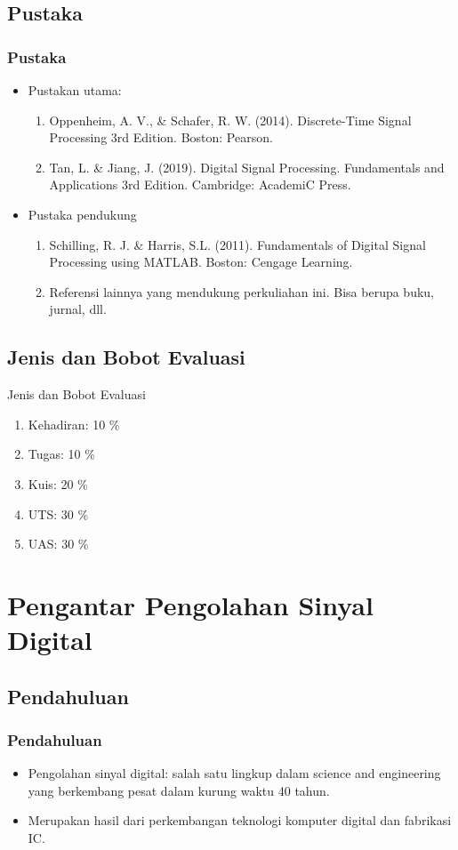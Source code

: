 \documentclass[pdflatex,compress]{beamer}
\begin{document}
\subsection{Pustaka}

\begin{frame}
	\frametitle{Pustaka}
	\begin{itemize}
		\item Pustakan utama:
		\begin{enumerate}
			\item Oppenheim, A. V., \& Schafer, R. W. (2014). Discrete-Time Signal Processing 3rd Edition. Boston: Pearson.
			\item Tan, L. \& Jiang, J. (2019). Digital Signal Processing. Fundamentals and Applications 3rd Edition. Cambridge: AcademiC Press.
		\end{enumerate}
		\item Pustaka pendukung
		\begin{enumerate}
			\item Schilling, R. J. \& Harris, S.L. (2011). Fundamentals of Digital Signal Processing using MATLAB. Boston:
			Cengage Learning.
			\item Referensi lainnya yang mendukung perkuliahan ini. Bisa berupa buku, jurnal, dll.
		\end{enumerate}
	\end{itemize}
\end{frame}

\subsection{Jenis dan Bobot Evaluasi}

\begin{frame}{Jenis dan Bobot Evaluasi}
	\begin{enumerate}
		\item Kehadiran: 10 \%
		\item Tugas: 10 \%
		\item Kuis: 20 \%
		\item UTS: 30 \%
		\item UAS: 30 \%
	\end{enumerate}
\end{frame}

\section{Pengantar Pengolahan Sinyal Digital}

\subsection{Pendahuluan}

\begin{frame}
	\frametitle{Pendahuluan}
	\begin{itemize}
		\item Pengolahan sinyal digital: salah satu lingkup dalam science and engineering yang berkembang pesat dalam kurung waktu 40 tahun.
		\item Merupakan hasil dari perkembangan teknologi komputer digital dan fabrikasi IC.
	\end{itemize}
\end{frame}
\end{document}
